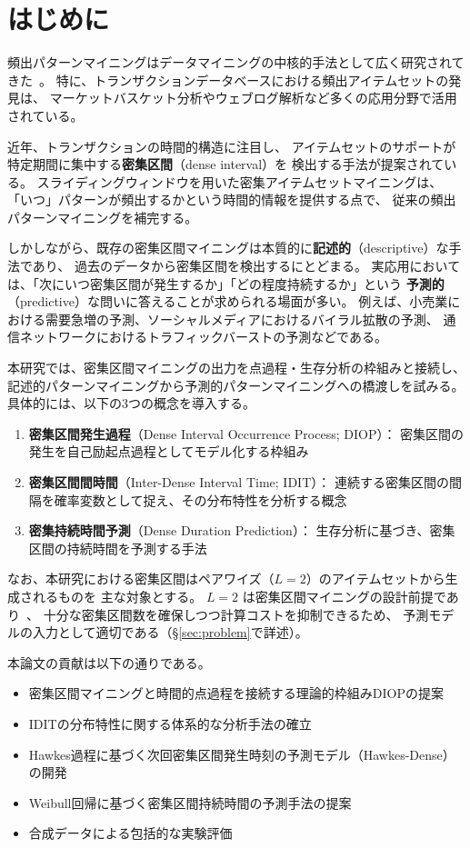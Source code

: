 \section{はじめに}\label{sec:introduction}

頻出パターンマイニングはデータマイニングの中核的手法として広く研究されてきた~\cite{agrawal1994fast,zaki2000scalable}。
特に、トランザクションデータベースにおける頻出アイテムセットの発見は、
マーケットバスケット分析やウェブログ解析など多くの応用分野で活用されている。

近年、トランザクションの時間的構造に注目し、
アイテムセットのサポートが特定期間に集中する\textbf{密集区間}（dense interval）を
検出する手法が提案されている。
スライディングウィンドウを用いた密集アイテムセットマイニングは、
「いつ」パターンが頻出するかという時間的情報を提供する点で、
従来の頻出パターンマイニングを補完する。

しかしながら、既存の密集区間マイニングは本質的に\textbf{記述的}（descriptive）な手法であり、
過去のデータから密集区間を検出するにとどまる。
実応用においては、「次にいつ密集区間が発生するか」「どの程度持続するか」という
\textbf{予測的}（predictive）な問いに答えることが求められる場面が多い。
例えば、小売業における需要急増の予測、ソーシャルメディアにおけるバイラル拡散の予測、
通信ネットワークにおけるトラフィックバーストの予測などである。

本研究では、密集区間マイニングの出力を点過程・生存分析の枠組みと接続し、
記述的パターンマイニングから予測的パターンマイニングへの橋渡しを試みる。
具体的には、以下の3つの概念を導入する。

\begin{enumerate}
  \item \textbf{密集区間発生過程}（Dense Interval Occurrence Process; DIOP）：
    密集区間の発生を自己励起点過程としてモデル化する枠組み
  \item \textbf{密集区間間時間}（Inter-Dense Interval Time; IDIT）：
    連続する密集区間の間隔を確率変数として捉え、その分布特性を分析する概念
  \item \textbf{密集持続時間予測}（Dense Duration Prediction）：
    生存分析に基づき、密集区間の持続時間を予測する手法
\end{enumerate}

なお、本研究における密集区間はペアワイズ（$L=2$）のアイテムセットから生成されるものを
主な対象とする。
$L=2$ は密集区間マイニングの設計前提であり~\cite{lancaster2018surges}、
十分な密集区間数を確保しつつ計算コストを抑制できるため、
予測モデルの入力として適切である（\S\ref{sec:problem}で詳述）。

本論文の貢献は以下の通りである。
\begin{itemize}
  \item 密集区間マイニングと時間的点過程を接続する理論的枠組みDIOPの提案
  \item IDITの分布特性に関する体系的な分析手法の確立
  \item Hawkes過程に基づく次回密集区間発生時刻の予測モデル（Hawkes-Dense）の開発
  \item Weibull回帰に基づく密集区間持続時間の予測手法の提案
  \item 合成データによる包括的な実験評価
\end{itemize}

